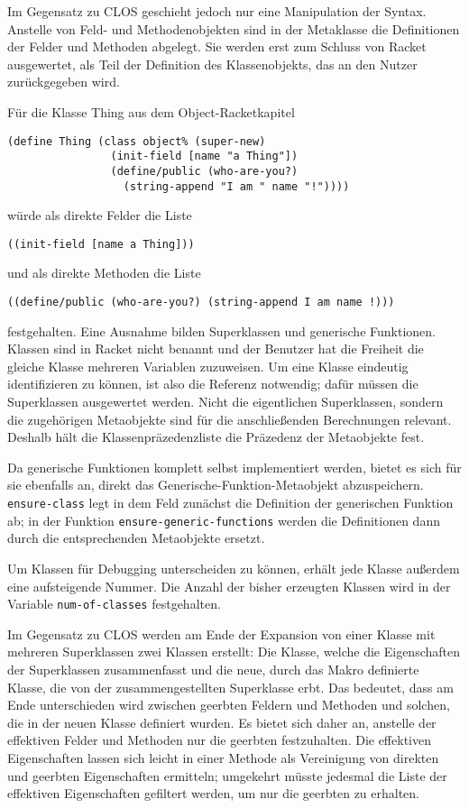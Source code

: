 Im Gegensatz zu CLOS geschieht jedoch nur eine Manipulation der Syntax. Anstelle von Feld- und Methodenobjekten sind in der Metaklasse die Definitionen der Felder und Methoden abgelegt. Sie werden erst zum Schluss von Racket ausgewertet, als Teil der Definition des Klassenobjekts, das an den Nutzer zurückgegeben wird.

Für die Klasse Thing aus dem Object-Racketkapitel

\begin{lstlisting}
(define Thing (class object% (super-new)
                (init-field [name "a Thing"])
                (define/public (who-are-you?) 
                  (string-append "I am " name "!"))))
\end{lstlisting}

würde als direkte Felder die Liste 

\texttt{{\textquotesingle}((init-field [name {\qq}a Thing\qq]))} 

und als direkte Methoden die Liste 

\texttt{{\textquotesingle}((define/public (who-are-you?) (string-append {\qq}I am {\qq} name \qq!\qq)))} 

festgehalten. Eine Ausnahme bilden Superklassen und generische Funktionen. Klassen sind in Racket nicht benannt und der Benutzer hat die Freiheit die gleiche Klasse mehreren Variablen zuzuweisen. Um eine Klasse eindeutig identifizieren zu können, ist also die Referenz notwendig; dafür müssen die Superklassen ausgewertet werden. Nicht die eigentlichen Superklassen, sondern die zugehörigen Metaobjekte sind für die anschließenden Berechnungen relevant. Deshalb hält die Klassenpräzedenzliste die Präzedenz der Metaobjekte fest. 

Da generische Funktionen komplett selbst implementiert werden, bietet es sich für sie ebenfalls an, direkt das Generische-Funktion-Metaobjekt abzuspeichern. \texttt{ensure-class} legt in dem Feld zunächst die Definition der generischen Funktion ab; in der Funktion \texttt{ensure-generic-functions} werden die Definitionen dann durch die entsprechenden Metaobjekte ersetzt.

Um Klassen für Debugging unterscheiden zu können, erhält jede Klasse außerdem eine aufsteigende Nummer. Die Anzahl der bisher erzeugten Klassen wird in der Variable \texttt{num-of-classes} festgehalten.

Im Gegensatz zu CLOS werden am Ende der Expansion von einer Klasse mit mehreren Superklassen zwei Klassen erstellt: Die Klasse, welche die Eigenschaften der Superklassen zusammenfasst und die neue, durch das Makro definierte Klasse, die von der zusammengestellten Superklasse erbt. Das bedeutet, dass am Ende unterschieden wird zwischen geerbten Feldern und Methoden und solchen, die in der neuen Klasse definiert wurden. Es bietet sich daher an, anstelle der effektiven Felder und Methoden nur die geerbten festzuhalten. Die effektiven Eigenschaften lassen sich leicht in einer Methode als Vereinigung von direkten und geerbten Eigenschaften ermitteln; umgekehrt müsste jedesmal die Liste der effektiven Eigenschaften gefiltert werden, um nur die geerbten zu erhalten. 

